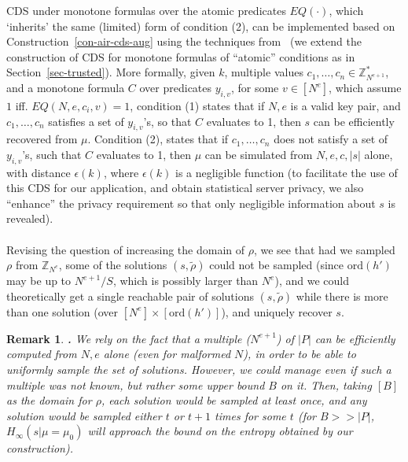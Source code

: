 \documentclass[11pt]{article}
\newcommand{\order}{{\mathrm{ord}}}
\newcommand{\size}[1]{|#1|}
\newcommand{\Z}{{\mathbb{Z}}}
\newtheorem{REMARK}{Remark}[section]
\newenvironment{remark}{\begin{REMARK} \hspace{-.85em} {\bf .} \rm}%
	{\end{REMARK}}
\newcommand{\opbrange}[3][,]{#2#1\ldots#1#3}
\newcommand{\U}[1]{\mathbb{Z}_{#1}^*}
\newcommand{\eps}{{\epsilon}}
\begin{document}
CDS under monotone formulas over the atomic predicates $EQ(\cdot)$, which `inherits' the same (limited) form of condition (2), can be implemented based on Construction~\ref{con-air-cds-aug} using the techniques from~\cite{AIR01,GIKM} (we extend the construction of CDS for monotone formulas of ``atomic'' 
conditions as in Section~\ref{sec-trusted}).
More formally, given $k$, multiple values $\opbrange{c_1}{c_n}\in\U{N^{e+1}}$, and a monotone formula $C$ over predicates $y_{i,v}$, for some $v\in[N^e]$, which assume $1$ iff. $EQ(N,e,c_i,v)=1$, condition (1) states that if $N,e$ is a valid key pair, and $\opbrange{c_1}{c_n}$ satisfies a set of $y_{i,v}$'s, so that $C$ evaluates to 1, then $s$ can be efficiently recovered from $\mu$. Condition (2), states that if $\opbrange{c_1}{c_n}$ does not satisfy a set of $y_{i,v}$'s, such that $C$ evaluates to 1, then $\mu$ can be simulated from $N,e,c,\size{s}$ alone, with distance $\eps(k)$, where $\eps(k)$ is a negligible function (to facilitate the use of this CDS
for our application, and obtain statistical server privacy, we also ``enhance'' the privacy requirement so that only negligible information about $s$ is revealed).
\paragraph{}Revising the question of increasing the domain of $\rho$, we see that had we sampled $\rho$ from $\Z_{N^e}$, some of the solutions $(s,\tilde{\rho})$ could not be sampled (since $\order(h')$ may be up to $N^{e+1}/S$, which is possibly larger than $N^e$), and we could theoretically get a single reachable pair of solutions $(s,\tilde{\rho})$ while there is more than one solution (over $[N^e]\times[\order(h')]$), and uniquely recover $s$.
\begin{remark}%
  We rely on the fact that a multiple ($N^{e+1}$) of $\size{P}$ can be efficiently
  computed from $N,e$ alone (even for malformed $N$), in order to be able to uniformly sample the set
  of solutions. However, we could manage even if such a multiple was not known, but rather some upper bound
  $B$ on it. Then, taking $[B]$ as the domain for $\rho$, each solution would be sampled at least once,
  and any solution would be sampled either $t$ or $t+1$ times for some $t$ (for $B>>\size{P}$, $H_{\infty}(s|\mu=\mu_0)$ will approach the bound on the entropy obtained by our construction).
\end{remark}
\end{document}
